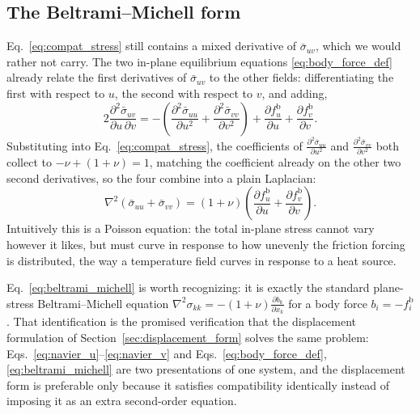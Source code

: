 \documentclass[11pt]{article}
\begin{document}
\subsection{The Beltrami--Michell form}\label{sec:beltrami}
Eq.~\eqref{eq:compat_stress} still contains a mixed derivative of
$\bar\sigma_{uv}$, which we would rather not carry. The two in-plane equilibrium
equations \eqref{eq:body_force_def} already relate the first derivatives of
$\bar\sigma_{uv}$ to the other fields: differentiating the first with respect to
$u$, the second with respect to $v$, and adding,
\begin{equation}\label{eq:mixed_elim}
    2\frac{\partial^{2} \bar\sigma_{uv}}{\partial u\,\partial v}
    = -\left(\frac{\partial^{2} \bar\sigma_{uu}}{\partial u^{2}}
      + \frac{\partial^{2} \bar\sigma_{vv}}{\partial v^{2}}\right)
      + \frac{\partial f_u^{\mathrm b}}{\partial u}
      + \frac{\partial f_v^{\mathrm b}}{\partial v}.
\end{equation}
Substituting into Eq.~\eqref{eq:compat_stress}, the coefficients of
$\frac{\partial^{2} \bar\sigma_{uu}}{\partial u^{2}}$ and
$\frac{\partial^{2} \bar\sigma_{vv}}{\partial v^{2}}$ both collect to
$-\nu + \left(1+\nu\right) = 1$, matching the coefficient already on the other
two second derivatives, so the four combine into a plain Laplacian:
\begin{equation}\label{eq:beltrami_michell}
    \boxed{\;\nabla^{2}\left(\bar\sigma_{uu} + \bar\sigma_{vv}\right)
    = \left(1+\nu\right)\left(\frac{\partial f_u^{\mathrm b}}{\partial u}
      + \frac{\partial f_v^{\mathrm b}}{\partial v}\right).\;}
\end{equation}
Intuitively this is a Poisson equation: the total in-plane stress cannot vary
however it likes, but must curve in response to how unevenly the friction forcing
is distributed, the way a temperature field curves in response to a heat source.

Eq.~\eqref{eq:beltrami_michell} is worth recognizing: it is exactly the standard
plane-stress Beltrami--Michell equation
$\nabla^{2}\sigma_{kk}
= -\left(1+\nu\right)\frac{\partial b_k}{\partial x_k}$ for a body force
$b_i = -f_i^{\mathrm b}$. That identification is the promised verification that
the displacement formulation of Section~\ref{sec:displacement_form} solves the
same problem: Eqs.~\eqref{eq:navier_u}--\eqref{eq:navier_v} and
Eqs.~\eqref{eq:body_force_def}, \eqref{eq:beltrami_michell} are two
presentations of one system, and the displacement form is preferable only because
it satisfies compatibility identically instead of imposing it as an extra
second-order equation.
\end{document}
